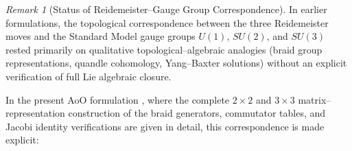 \documentclass[12pt]{article}
\theoremstyle{remark}
\newtheorem*{remark}{Remark}
\begin{document}
%

\begin{remark}[Status of Reidemeister–Gauge Group Correspondence]
In earlier formulations, the topological correspondence between the three Reidemeister moves and 
the Standard Model gauge groups $U(1)$, $SU(2)$, and $SU(3)$ rested primarily on qualitative 
topological–algebraic analogies (braid group representations, quandle cohomology, Yang–Baxter solutions) 
without an explicit verification of full Lie algebraic closure.

In the present AoO formulation \cite[Sec.~3.3]{AoOSMGauge2025}, where the complete $2\times 2$ and $3\times 3$
matrix–representation construction of the braid generators, commutator tables, and Jacobi identity 
verifications are given in detail, this correspondence is made explicit:


\end{remark}
\end{document}
